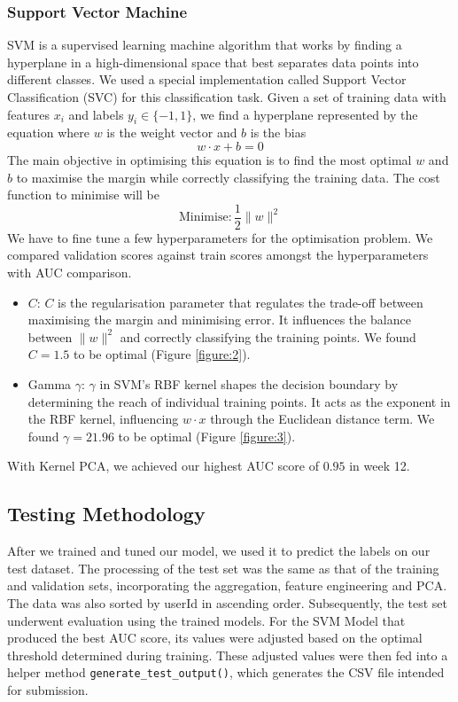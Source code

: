 \documentclass[12pt]{article}
\begin{document}
\subsubsection{Support Vector Machine}
SVM is a supervised learning machine algorithm that works by finding a hyperplane in a high-dimensional space that best separates data points into different classes. We used a special implementation called Support Vector Classification (SVC) for this classification task. Given a set of training data with features $x_i$ and labels $y_i \in \{-1, 1\}$, we find a hyperplane represented by the equation where $w$ is the weight vector and $b$ is the bias
$$
w\cdot x + b = 0
$$
The main objective in optimising this equation is to find the most optimal $w$ and $b$ to maximise the margin while correctly classifying the training data. The cost function to minimise will be
$$
  \text{Minimise}: \frac{1}{2}\lVert w\rVert^2
$$
We have to fine tune a few hyperparameters for the optimisation problem. We compared validation scores against train scores amongst the hyperparameters with AUC comparison.

\begin{itemize}
  \item $C$: $C$ is the regularisation parameter that regulates the trade-off between maximising the margin and minimising error. It influences the balance between $\lVert w\rVert^2$ and correctly classifying the training points. We found $C=1.5$ to be optimal (Figure \ref{figure:2}).
  \item Gamma $\gamma$: $\gamma$ in SVM's RBF kernel shapes the decision boundary by determining the reach of individual training points. It acts as the exponent in the RBF kernel, influencing $w\cdot x$ through the Euclidean distance term. We found $\gamma = 21.96$ to be optimal (Figure \ref{figure:3}).
\end{itemize}
With Kernel PCA, we achieved our highest AUC score of $0.95$ in week 12.

\subsection{Testing Methodology}
After we trained and tuned our model, we used it to predict the labels on our test dataset. The processing of the test set was the same as that of the training and validation sets, incorporating the aggregation, feature engineering and PCA. The data was also sorted by userId in ascending order. Subsequently, the test set underwent evaluation using the trained models. For the SVM Model that produced the best AUC score, its values were adjusted based on the optimal threshold determined during training. These adjusted values were then fed into a helper method \lstinline{generate_test_output()}, which generates the CSV file intended for submission.
\end{document}
